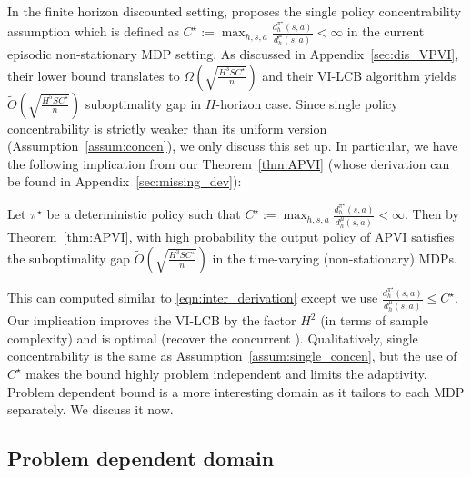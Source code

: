 In the finite horizon discounted setting, \cite{rashidinejad2021bridging} proposes the single policy concentrability assumption which is defined as $C^\star:=\max_{h,s,a}\frac{d^{\pi^\star}_h(s,a)}{d^\mu_h(s,a)}<\infty$ in the current episodic non-stationary MDP setting. As discussed in Appendix~\ref{sec:dis_VPVI}, their lower bound translates to $\Omega(\sqrt{\frac{H^3SC^\star}{n}})$ and their VI-LCB algorithm yields $\widetilde{O}(\sqrt{\frac{H^5SC^\star}{n}})$ suboptimality gap in $H$-horizon case. Since single policy concentrability is strictly weaker than its uniform version (Assumption~\ref{assum:concen}), we only discuss this set up. In particular, we have the following implication from our Theorem~\ref{thm:APVI} (whose derivation can be found in Appendix~\ref{sec:missing_dev}):

\begin{proposition}
	Let $\pi^\star$ be a deterministic policy such that $C^\star:=\max_{h,s,a}\frac{d^{\pi^\star}_h(s,a)}{d^\mu_h(s,a)}<\infty$. Then by Theorem~\ref{thm:APVI}, with high probability the output policy of APVI satisfies the suboptimality gap $\widetilde{O}(\sqrt{\frac{H^3SC^\star}{n}})$ in the time-varying (non-stationary) MDPs. 
\end{proposition}
This can computed similar to \eqref{eqn:inter_derivation} except we use $\frac{d^{\pi^\star}_h(s,a)}{d^\mu_h(s,a)}\leq C^\star$. Our implication improves the VI-LCB by the factor $H^2$ (in terms of sample complexity) and is optimal (recover the concurrent \cite{xie2021policy}). Qualitatively, single concentrability is the same as Assumption~\ref{assum:single_concen}, but the use of $C^\star$ makes the bound highly problem independent and limits the adaptivity. Problem dependent bound is a more interesting domain as it tailors to each MDP separately. We discuss it now.



\subsection{Problem dependent domain}\label{subsec:three}

